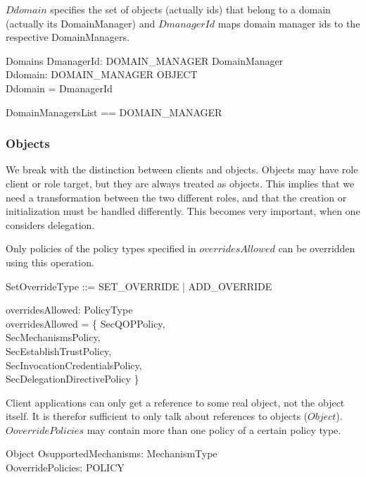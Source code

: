 $Ddomain$ specifies the set of objects (actually ids) that belong to a domain
(actually its DomainManager) and $DmanagerId$ maps domain manager ids to the
respective DomainManagers.
\begin{schema}{Domains}
  DmanagerId: DOMAIN\_MANAGER \pinj DomainManager \\
  Ddomain: DOMAIN\_MANAGER \pfun \power OBJECT \\
  \where
  \dom Ddomain = \dom DmanagerId \\
\end{schema}
\begin{zed}
  DomainManagersList == \seq DOMAIN\_MANAGER \\
\end{zed}


\subsubsection{Objects} \label{sec:objects}
We break with the distinction between clients and objects.  Objects may have
role client or role target, but they are always treated as objects.  This
implies that we need a transformation between the two different roles, and that
the creation or initialization must be handled differently.  This becomes very
important, when one considers delegation.

Only policies of the policy types specified in $overridesAllowed$ can be
overridden using this operation.
 
\begin{zed}
  SetOverrideType ::= SET\_OVERRIDE | ADD\_OVERRIDE \\
\end{zed}
\begin{axdef}
  overridesAllowed: \power PolicyType \\
  \where
  overridesAllowed = \{ \< SecQOPPolicy, \\
  SecMechanismsPolicy, \\
  SecEstablishTrustPolicy, \\
  SecInvocationCredentialsPolicy, \\
  SecDelegationDirectivePolicy \} \>
\end{axdef}

Client applications can only get a reference to some real object, not the object
itself.  It is therefor sufficient to only talk about references to objects
($Object$).  $OoverridePolicies$ may contain more than one policy of a certain
policy type.
\begin{schema}{Object}
  OsupportedMechanisms: \power MechanismType \\
  OoverridePolicies: \power POLICY \\
\end{schema}

